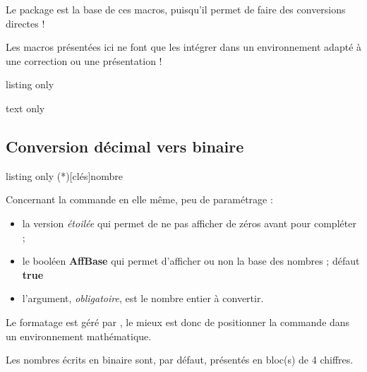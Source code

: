 \documentclass[a4paper,french,11pt]{article}
\newcommand\ctex[1]{\tcbox[vignettelatex]{#1}}
\newcommand\Cle[1]{{\bfseries\sffamily\textlangle \textcolor{orange!75!black}{#1}\textrangle}}
\begin{document}
\begin{noteblock}
Le package \ctex{xintbinhex} est la base de ces macros, puisqu'il permet de faire des conversions directes !

\smallskip

Les macros présentées ici ne font que les intégrer dans un environnement adapté à une correction ou une présentation !
\end{noteblock}

\begin{PresCodeTexPL}{listing only}
\end{PresCodeTexPL}

\begin{PresCodeSortiePL}{text only}






\end{PresCodeSortiePL}

\subsection{Conversion décimal vers binaire}

\begin{PresCodeTexPL}{listing only}
\ConversionDecBin(*)[clés]{nombre}
\end{PresCodeTexPL}

\begin{cautionblock}
Concernant la commande en elle même, peu de paramétrage :

\begin{itemize}
	\item la version \textit{étoilée} qui permet de ne pas afficher de zéros avant pour \og compléter \fg{} ;
	\item le booléen \Cle{AffBase} qui permet d'afficher ou non la base des nombres ; \hfill{}défaut \Cle{true}
	\item l'argument, \textit{obligatoire}, est le nombre entier à convertir.
\end{itemize}

Le formatage est géré par \ctex{sinuitx}, le mieux est donc de positionner la commande dans un environnement mathématique.

\smallskip

Les nombres écrits en binaire sont, par défaut, présentés en bloc(s) de 4 chiffres.
\end{cautionblock}
\end{document}
